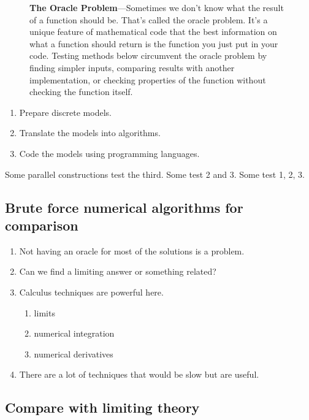 \documentclass[fleqn,10pt]{olplainarticle}
\newenvironment{callout}
{
\begin{figure}
\begin{center}
\begin{minipage}{0.9\textwidth}
\begin{framed}
}
{
\end{framed}
\end{minipage}
\end{center}
\end{figure}
}
\begin{document}
\begin{callout}
\textbf{The Oracle Problem}---Sometimes
we don't know what the result of a function should be. That's called
the oracle problem. It's a unique feature of mathematical code that
the best information on what a function should return is the function you just
put in your code. Testing methods below circumvent the oracle problem
by finding simpler inputs, comparing results with another implementation,
or checking properties of the function without checking the function itself.
\end{callout}

\begin{enumerate}
  \item Prepare discrete models.
  \item Translate the models into algorithms.
  \item Code the models using programming languages.
\end{enumerate}
Some parallel constructions test the third. Some test 2 and 3. Some test 1, 2, 3.

\subsection{Brute force numerical algorithms for comparison}

\begin{enumerate}
    \item Not having an oracle for most of the solutions is a problem.

    \item Can we find a limiting answer or something related?

    \item Calculus techniques are powerful here.

    \begin{enumerate}
       \item limits

       \item numerical integration
       
       \item numerical derivatives
    \end{enumerate}
    \item There are a lot of techniques that would be slow but are useful.
\end{enumerate}




\subsection{Compare with limiting theory}\label{sec:limits}
\end{document}
